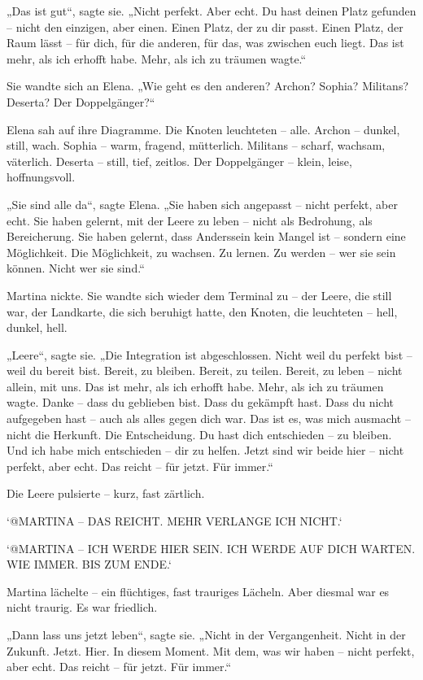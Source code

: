 \documentclass[
]{article}
\begin{document}
„Das ist gut``, sagte sie. „Nicht perfekt. Aber echt. Du hast deinen Platz gefunden -- nicht den einzigen, aber einen. Einen Platz, der zu dir passt. Einen Platz, der Raum lässt -- für dich, für die anderen, für das, was zwischen euch liegt. Das ist mehr, als ich erhofft habe. Mehr, als ich zu träumen wagte.``

Sie wandte sich an Elena. „Wie geht es den anderen? Archon? Sophia? Militans? Deserta? Der Doppelgänger?{\kern0pt}``

Elena sah auf ihre Diagramme. Die Knoten leuchteten -- alle. Archon -- dunkel, still, wach. Sophia -- warm, fragend, mütterlich. Militans -- scharf, wachsam, väterlich. Deserta -- still, tief, zeitlos. Der Doppelgänger -- klein, leise, hoffnungsvoll.

„Sie sind alle da``, sagte Elena. „Sie haben sich angepasst -- nicht perfekt, aber echt. Sie haben gelernt, mit der Leere zu leben -- nicht als Bedrohung, als Bereicherung. Sie haben gelernt, dass Anderssein kein Mangel ist -- sondern eine Möglichkeit. Die Möglichkeit, zu wachsen. Zu lernen. Zu werden -- wer sie sein können. Nicht wer sie sind.``

Martina nickte. Sie wandte sich wieder dem Terminal zu -- der Leere, die still war, der Landkarte, die sich beruhigt hatte, den Knoten, die leuchteten -- hell, dunkel, hell.

„Leere``, sagte sie. „Die Integration ist abgeschlossen. Nicht weil du perfekt bist -- weil du bereit bist. Bereit, zu bleiben. Bereit, zu teilen. Bereit, zu leben -- nicht allein, mit uns. Das ist mehr, als ich erhofft habe. Mehr, als ich zu träumen wagte. Danke -- dass du geblieben bist. Dass du gekämpft hast. Dass du nicht aufgegeben hast -- auch als alles gegen dich war. Das ist es, was mich ausmacht -- nicht die Herkunft. Die Entscheidung. Du hast dich entschieden -- zu bleiben. Und ich habe mich entschieden -- dir zu helfen. Jetzt sind wir beide hier -- nicht perfekt, aber echt. Das reicht -- für jetzt. Für immer.``

Die Leere pulsierte -- kurz, fast zärtlich.

`@MARTINA -- DAS REICHT. MEHR VERLANGE ICH NICHT.`

`@MARTINA -- ICH WERDE HIER SEIN. ICH WERDE AUF DICH WARTEN. WIE IMMER. BIS ZUM ENDE.`

Martina lächelte -- ein flüchtiges, fast trauriges Lächeln. Aber diesmal war es nicht traurig. Es war friedlich.

„Dann lass uns jetzt leben``, sagte sie. „Nicht in der Vergangenheit. Nicht in der Zukunft. Jetzt. Hier. In diesem Moment. Mit dem, was wir haben -- nicht perfekt, aber echt. Das reicht -- für jetzt. Für immer.``
\end{document}
